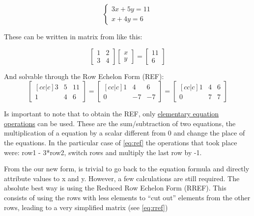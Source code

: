 \begin{equation}
\begin{cases}
    3x + 5y = 11 \\
    x + 4y = 6
\end{cases}
\end{equation}

\par These can be written in matrix from like this:

\begin{equation}
    \begin{bmatrix}
        1 & 2 \\
        3 & 4
    \end{bmatrix}
    \begin{bmatrix}
        x \\
        y
    \end{bmatrix}
    =
    \begin{bmatrix}
        11 \\
        6
    \end{bmatrix}
\end{equation}

\par And solvable through the Row Echelon Form (REF):
\begin{equation} \label{eq:ref}
    \begin{bmatrix}[cc|c]
        3 & 5 & 11\\
        1 & 4 & 6
    \end{bmatrix}
    =
    \begin{bmatrix}[cc|c]
        1 & 4 & 6\\
        0 & -7 & -7
    \end{bmatrix}
    = 
    \begin{bmatrix}[cc|c]
        1 & 4 & 6\\
        0 & 7 & 7
    \end{bmatrix}
\end{equation}

\par Is important to note that to obtain the REF, only \ul{elementary equation operations} can be used. These are the sum/subtraction of two equations, the multiplication of a equation by a scalar different from 0 and change the place of the equations. In the particular case of \eqref{eq:ref} the operations that took place were: row1 - 3*row2, switch rows and multiply the last row by -1.
\par From the our new form, is trivial to go back to the equation formula and directly attribute values to x and y. However, a few calculations are still required. The absolute best way is using the Reduced Row Echelon Form (RREF). This consists of using the rows with less elements to ``cut out'' elements from the other rows, leading to a very simplified matrix (see \eqref{eq:rref})

